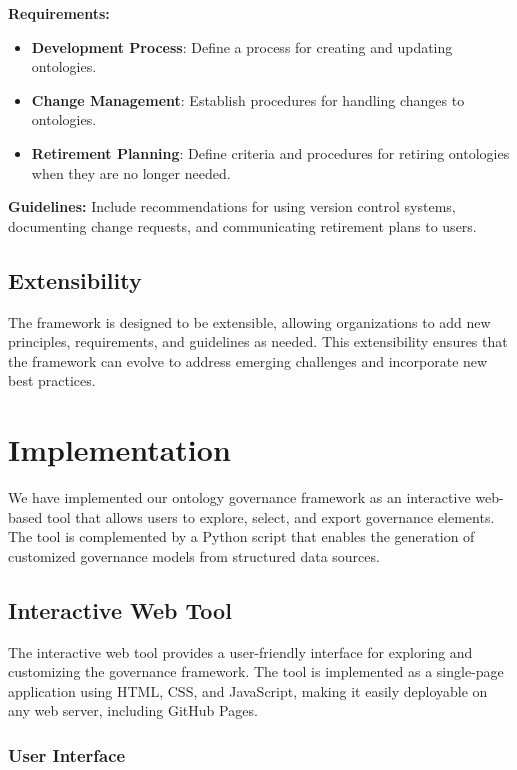 \documentclass[conference]{IEEEtran}
\begin{document}
\textbf{Requirements:}
\begin{itemize}
    \item \textbf{Development Process}: Define a process for creating and updating ontologies.
    \item \textbf{Change Management}: Establish procedures for handling changes to ontologies.
    \item \textbf{Retirement Planning}: Define criteria and procedures for retiring ontologies when they are no longer needed.
\end{itemize}

\textbf{Guidelines:} Include recommendations for using version control systems, documenting change requests, and communicating retirement plans to users.

\subsection{Extensibility}

The framework is designed to be extensible, allowing organizations to add new principles, requirements, and guidelines as needed. This extensibility ensures that the framework can evolve to address emerging challenges and incorporate new best practices.

\section{Implementation}
\label{sec:implementation}

We have implemented our ontology governance framework as an interactive web-based tool that allows users to explore, select, and export governance elements. The tool is complemented by a Python script that enables the generation of customized governance models from structured data sources.

\subsection{Interactive Web Tool}

The interactive web tool provides a user-friendly interface for exploring and customizing the governance framework. The tool is implemented as a single-page application using HTML, CSS, and JavaScript, making it easily deployable on any web server, including GitHub Pages.

\subsubsection{User Interface}
\end{document}
